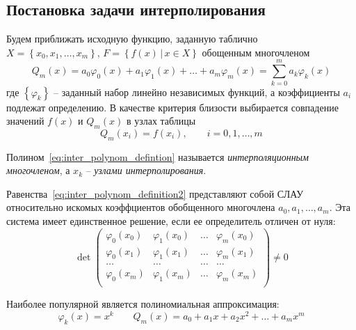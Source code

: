 \subsection{Постановка задачи интерполирования}
Будем приближать исходную функцию, заданную таблично $\displaystyle X = \left\{x_0, x_1,\dots,x_m\right\},\,F = \left\{f(x)\,|\, x \in X\right\}$
обощенным многочленом
\begin{equation}
    Q_m(x) = a_0 \varphi_0(x) + a_1 \varphi_1(x) + \dots + a_m \varphi_m(x) = \sum_{k=0}^m a_k\varphi_k(x)\label{eq:inter_polynom_defintion}
\end{equation}
где $\left\{ \varphi_k \right\}$ -- заданный набор линейно независимых функций, а
коэффициенты $a_i$ подлежат определению. В качестве критерия близости выбирается
совпадение значений $f(x)$ и $Q_m(x)$ в узлах таблицы
\begin{equation}
    Q_m(x_i) = f(x_i), \qquad i = 0,1,\dots,m\label{eq:inter_polynom_definition2}
\end{equation}
\begin{definition}
    Полином~\eqref{eq:inter_polynom_defintion} называется \emph{интерполяционным многочленом},
    а $x_k$ -- \emph{узлами интерполирования}.
\end{definition}

Равенства~\eqref{eq:inter_polynom_definition2} представляют собой СЛАУ относительно
искомых коэффциентов обобщенного многочлена $a_0, a_1, \dots, a_m$. Эта система
имеет единственное решение, если ее определитель отличен от нуля:
\begin{equation*}
    \det
    \begin{pmatrix}
        \varphi_0(x_0) & \varphi_1(x_0) & \dots & \varphi_m(x_0) \\
        \varphi_0(x_1) & \varphi_1(x_1) & \dots & \varphi_m(x_1) \\
        \dots          & \dots          & \dots & \dots          \\
        \varphi_0(x_m) & \varphi_1(x_m) & \dots & \varphi_m(x_m) \\
    \end{pmatrix}
    \neq 0
\end{equation*}

Наиболее популярной является полиномиальная аппроксимация:
\begin{equation*}
    \varphi_k(x) = x^k \qquad Q_m(x) = a_0 + a_1 x + a_2 x^2 + \dots + a_m x^m
\end{equation*}

